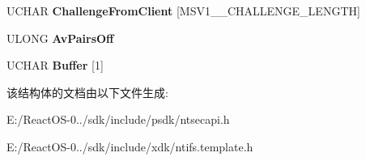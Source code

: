 \begin{DoxyCompactItemize}
U\+C\+H\+AR {\bfseries Challenge\+From\+Client} \mbox{[}M\+S\+V1\+\_\+\_\+\+C\+H\+A\+L\+L\+E\+N\+G\+E\+\_\+\+L\+E\+N\+G\+TH\mbox{]}
\item 
\mbox{\label{struct___m_s_v1__0___n_t_l_m3___r_e_s_p_o_n_s_e_aeddbad2f367791874c0b9efd7531c60e}} 
U\+L\+O\+NG {\bfseries Av\+Pairs\+Off}
\item 
\mbox{\label{struct___m_s_v1__0___n_t_l_m3___r_e_s_p_o_n_s_e_ae0b5bbc49bbbf163d5cdee334d902fc9}} 
U\+C\+H\+AR {\bfseries Buffer} \mbox{[}1\mbox{]}
\end{DoxyCompactItemize}


该结构体的文档由以下文件生成\+:\begin{DoxyCompactItemize}
\item 
E\+:/\+React\+O\+S-\/0../sdk/include/psdk/ntsecapi.\+h\item 
E\+:/\+React\+O\+S-\/0../sdk/include/xdk/ntifs.\+template.\+h\end{DoxyCompactItemize}
